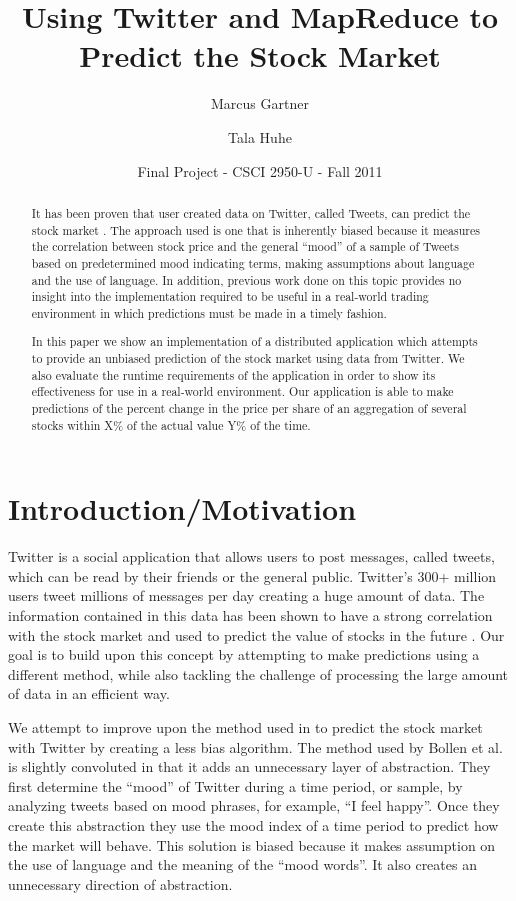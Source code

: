\documentclass[twocolumn]{article}
\begin{document}
\title{Using Twitter and MapReduce to Predict the Stock Market}
\author{Marcus Gartner \and Tala Huhe}
\date{Final Project - CSCI 2950-U - Fall 2011}
\maketitle

\begin{abstract}
\noindent
It has been proven that user created data on Twitter, called Tweets, can predict the stock market \cite{bollen}. The approach used is one that is inherently biased because it measures the correlation between stock price and the general “mood” of a sample of Tweets based on predetermined mood indicating terms, making assumptions about language and the use of language. In addition, previous work done on this topic provides no insight into the implementation required to be useful in a real-world trading environment in which predictions must be made in a timely fashion.

In this paper we show an implementation of a distributed application which attempts to provide an unbiased prediction of the stock market using data from Twitter. We also evaluate the runtime requirements of the application in order to show its effectiveness for use in a real-world environment. Our application is able to make predictions of the percent change in the price per share of an aggregation of several stocks within X\% of the actual value Y\% of the time.
\end{abstract}

\section{Introduction/Motivation}
Twitter is a social application that allows users to post messages, called tweets, which can be read by their friends or the general public. Twitter’s 300+ million users tweet millions of messages per day creating a huge amount of data. The information contained in this data has been shown to have a strong correlation with the stock market and used to predict the value of stocks in the future \cite{bollen}. Our goal is to build upon this concept by attempting to make predictions using a different method, while also tackling the challenge of processing the large amount of data in an efficient way.

We attempt to improve upon the method used in \cite{bollen} to predict the stock market with Twitter by creating a less bias algorithm. The method used by Bollen et al. is slightly convoluted in that it adds an unnecessary layer of abstraction. They first determine the “mood” of Twitter during a time period, or sample, by analyzing tweets based on mood phrases, for example, “I feel happy”. Once they create this abstraction they use the mood index of a time period to predict how the market will behave. This solution is biased because it makes assumption on the use of language and the meaning of the “mood words”. It also creates an unnecessary direction of abstraction.
\end{document}
